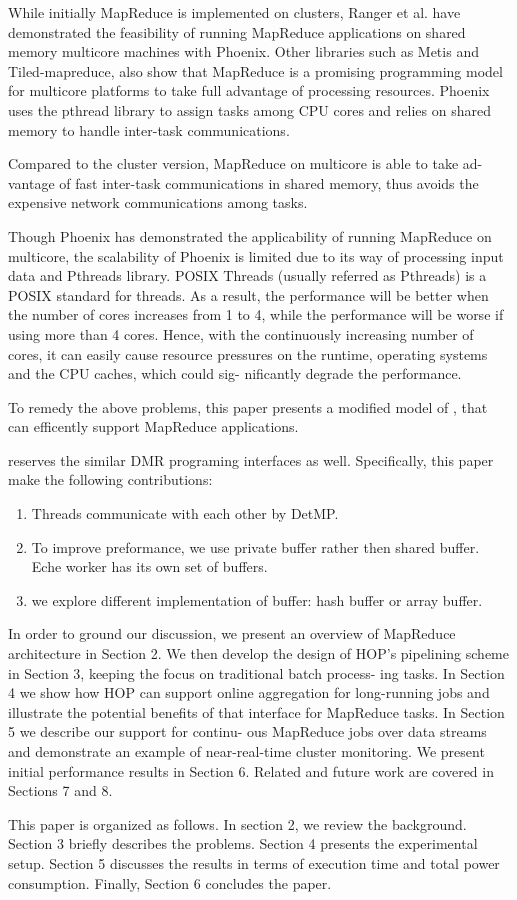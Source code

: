 While initially MapReduce is implemented on clusters, Ranger
et al. have demonstrated the feasibility of running MapReduce
applications on shared memory multicore machines with 
Phoenix\cite{ranger2007phoenix}.
Other libraries such as Metis\cite{mao2010metis} 
and Tiled-mapreduce\cite{chen2010tiled},
also show that MapReduce is a promising programming model 
for multicore platforms to take full advantage of  
processing resources.
Phoenix uses the pthread library to assign tasks 
among CPU cores and relies on
shared memory to handle inter-task communications.

Compared to the cluster version, MapReduce on multicore is able to take ad-
vantage of fast inter-task communications in shared memory, thus
avoids the expensive network communications among tasks.

Though Phoenix has demonstrated the applicability of running
MapReduce on multicore, the scalability of Phoenix is limited 
due to its way of processing input data and Pthreads library.
POSIX Threads (usually referred as Pthreads)
is a POSIX standard for threads.
As a result, the performance will be better 
when the number of cores increases from 1 to 4, 
while the performance will be worse if using more than 4 cores.  
Hence, with the continuously increasing
number of cores, it can easily cause resource pressures on the
runtime, operating systems and the CPU caches, which could sig-
nificantly degrade the performance. 

To remedy the above problems, this paper presents a modified model of \myds, 
that can efficently support MapReduce applications.



\myds reserves the similar DMR programing interfaces as well.
Specifically, this paper make the following contributions:
\begin{enumerate}
\item Threads communicate with each other by DetMP.
\item To improve preformance, we use private buffer rather then shared buffer. Eche worker has its own set of buffers. 
\item we explore different implementation of buffer: hash buffer or array buffer.
\end{enumerate}

In order to ground our discussion, we present an overview
of MapReduce architecture in Section 2. We
then develop the design of HOP’s pipelining scheme in
Section 3, keeping the focus on traditional batch process-
ing tasks. In Section 4 we show how HOP can support
online aggregation for long-running jobs and illustrate
the potential benefits of that interface for MapReduce
tasks. In Section 5 we describe our support for continu-
ous MapReduce jobs over data streams and demonstrate
an example of near-real-time cluster monitoring. We
present initial performance results in Section 6. Related
and future work are covered in Sections 7 and 8.

This paper is organized as follows. In section 2, we review
the background. Section 3 briefly describes the problems.
Section 4 presents the experimental setup. Section 5 discusses
the results in terms of execution time and total power
consumption. Finally, Section 6 concludes the paper.


